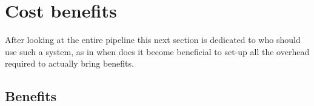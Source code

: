 %
%
%
%
%
%

\section{Cost benefits}
\label{sec:costbenefits}

After looking at the entire pipeline this next section is dedicated to who should use such a system, as in when does it become beneficial to set-up all the overhead required to actually bring benefits.

\subsection{Benefits}

